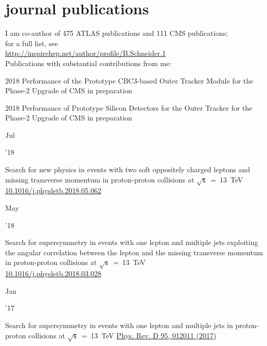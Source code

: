 \documentclass[]{cv} %
\begin{document}
\section{journal publications}
\begin{entrylist}

  \entry
  {}
  {I am co-author of 475 ATLAS publications and 111 CMS publications;\\
  for a full list, see \\
    \href{http://inspirehep.net/author/profile/B.Schneider.1}{http://inspirehep.net/author/profile/B.Schneider.1}\\
  Publications with substantial contributions from me:}
  {}
  {\vspace*{\spacingPubs}}

  \entry
  {2018}
  {Performance of the Prototype CBC3-based Outer Tracker Module for the Phase-2
  Upgrade of CMS}
  {in preparation}
  {\vspace*{\spacingPubs}}

  \entry
  {2018}
  {Performance of Prototype Silicon Detectors for the Outer Tracker for the
  Phase-2 Upgrade of CMS}
  {in preparation}
  {\vspace*{\spacingPubs}}

  \entry
  {\parbox[t]{\parboxWidthOne}{Jul}\parbox[t]{\parboxWidthTwo}{\hfill '18}}
  {Search for new physics in events with two soft oppositely charged leptons and missing transverse momentum in proton-proton collisions at $\sqrt{\mathsf{s}}$~=~13~TeV}
    {\href{https://www.sciencedirect.com/science/article/pii/S037026931830426X}{10.1016/j.physletb.2018.05.062}}
  {\vspace*{\spacingPubs}}

  \entry
  {\parbox[t]{\parboxWidthOne}{May}\parbox[t]{\parboxWidthTwo}{\hfill '18}}
  {Search for supersymmetry in events with one lepton and multiple jets exploiting the angular correlation between the lepton and the missing transverse momentum in proton-proton collisions at $\sqrt{\mathsf{s}}$~=~13~TeV\\}
    {\href{https://www.sciencedirect.com/science/article/pii/S037026931830217X}{10.1016/j.physletb.2018.03.028}}
  {\vspace*{\spacingPubs}}

  \entry
  {\parbox[t]{\parboxWidthOne}{Jan}\parbox[t]{\parboxWidthTwo}{\hfill '17}}
  {Search for supersymmetry in events with one lepton and multiple jets in proton-proton collisions at $\sqrt{\mathsf{s}}$~=~13~TeV}
    {\href{https://journals.aps.org/prd/abstract/10.1103/PhysRevD.95.012011}{Phys. Rev. D 95, 012011 (2017)}}
  {\vspace*{\spacingPubs}}


\end{entrylist}
\end{document}
